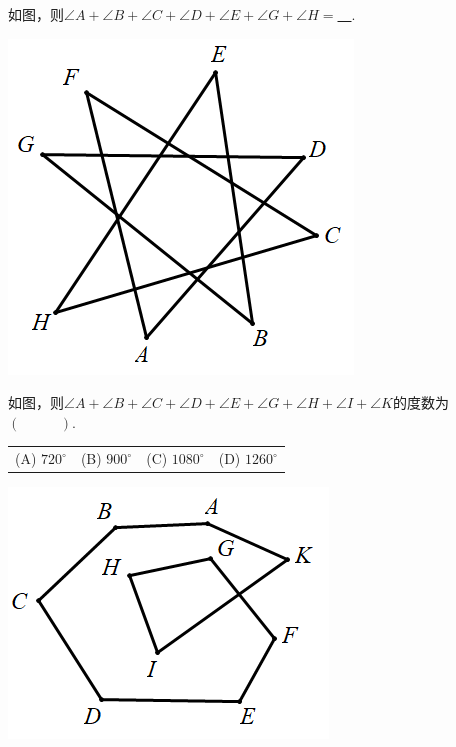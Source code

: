\documentclass[10pt]{ctexart}
\newcommand{\onech}[4]{
\renewcommand\arraystretch{1.4}
\begin{tabularx}{\linewidth}{XXXX}
\setlength\tabcolsep{0pt}
(A) #1 & (B) #2 & (C) #3 & (D) #4 \\
\end{tabularx}
\unskip \unskip}
\begin{document}
\begin{shaded}
\begin{example}
如图，则$\angle A+\angle B+\angle C+\angle D+\angle E+\angle G+\angle H=$\underline{~\hspace{1cm}~}.
\end{example}
\end{shaded}
 \includegraphics[scale=0.5]{figure/bazhi07.PNG}
\begin{shaded}
\begin{example}
如图，则$\angle A+\angle B+\angle C+\angle D+\angle E+\angle G+\angle H+\angle I+\angle K$的度数为$(~\hspace{1cm}~)$.\\
\onech{$720^\circ$}{$900^\circ$}{$1080^\circ$}{$1260^\circ$}
\end{example}
\end{shaded}
 \includegraphics[scale=0.5]{figure/bazhi08.PNG}
\end{document}
